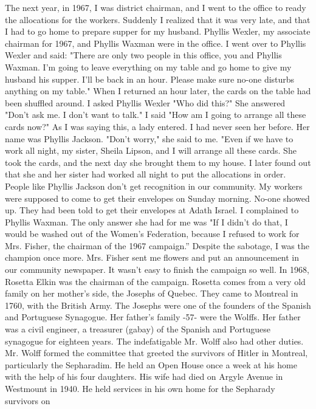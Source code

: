 The next year, in 1967, I was district chairman, and I went to 
the office to ready the allocations for the workers. Suddenly I realized 
that it was very late, and that I had to go home to prepare supper for my 
husband. Phyllis Wexler, my associate chairman for 1967, and Phyllis Waxman were in the office. I went over to Phyllis Wexler and said: "There are only two people in this office, you and Phyllis Waxman. I'm going to leave everything on my table and go home to give my husband his supper. I’ll be back in an hour. Please make sure no-one disturbs anything on my table." 
When I returned an hour later, the cards on the table had been shuffled 
around. I asked Phyllis Wexler "Who did this?" She answered "Don't ask me. I don't want to talk." I said "How am I going to arrange all these cards now?" As I was saying this, a lady entered. I had never seen her before. 
Her name was Phyllis Jackson. "Don't worry," she said to me. "Even if we have to work all night, my sister, Sheila Lipson, and I will arrange all these cards. 
She took the cards, and the next day she brought them to my house. I later found out that she and her sister had worked all night to put the allocations in order. People like Phyllis Jackson don't get recognition in our community. 
My workers were supposed to come to get their envelopes on Sunday morning. No-one showed up. They had been told to get their envelopes at 
Adath Israel. I complained to Phyllis Waxman. The only answer she had for me was "If I didn't do that, I would be washed out of the Women's Federation, because I refused to work for Mrs. Fisher, the chairman of the 1967 campaign.” Despite the sabotage, I was the champion once more. Mrs. Fisher sent me flowers and put an announcement in our community newspaper. It 
wasn't easy to finish the campaign so well. 
In 1968, Rosetta Elkin was the chairman of the campaign. Rosetta comes 
from a very old family on her mother's side, the Josephs of Quebec. They 
came to Montreal in 1760, with the British Army. The Josephs were one of 
the founders of the Spanish and Portuguese Synagogue. Her father's family 
-57- 
were the Wolffs. Her father was a civil engineer, a treasurer
(gabay) of the Spanish and Portuguese synagogue for eighteen years. The indefatigable Mr. Wolff also had other duties. Mr. Wolff formed the committee that greeted the survivors of Hitler in Montreal, particularly the Sepharadim. He held an Open House once a week at his home with the help of his four daughters. His wife had died on Argyle Avenue in Westmount 
in 1940. He held services in his own home for the Sepharady survivors on 
